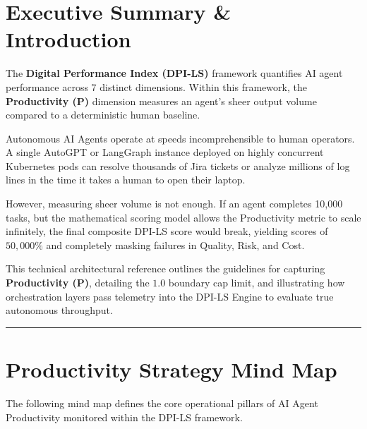 \documentclass[11pt,a4paper]{article}
\begin{document}
\pagecolor{white}
\color{black}

\tableofcontents
\newpage

\section{Executive Summary \& Introduction}

\begin{dpinote}
The \textbf{Digital Performance Index (DPI-LS)} framework quantifies AI agent performance across 7 distinct dimensions. Within this framework, the \textbf{Productivity (P)} dimension measures an agent's sheer output volume compared to a deterministic human baseline.
\end{dpinote}

Autonomous AI Agents operate at speeds incomprehensible to human operators. A single AutoGPT or LangGraph instance deployed on highly concurrent Kubernetes pods can resolve thousands of Jira tickets or analyze millions of log lines in the time it takes a human to open their laptop. 

However, measuring sheer volume is not enough. If an agent completes 10,000 tasks, but the mathematical scoring model allows the Productivity metric to scale infinitely, the final composite DPI-LS score would break, yielding scores of $50,000\%$ and completely masking failures in Quality, Risk, and Cost.

This technical architectural reference outlines the guidelines for capturing \textbf{Productivity (P)}, detailing the $1.0$ boundary cap limit, and illustrating how orchestration layers pass telemetry into the DPI-LS Engine to evaluate true autonomous throughput.

\vspace{0.5cm}
\hrule
\vspace{1cm}

\section{Productivity Strategy Mind Map}

The following mind map defines the core operational pillars of AI Agent Productivity monitored within the DPI-LS framework.
\end{document}
